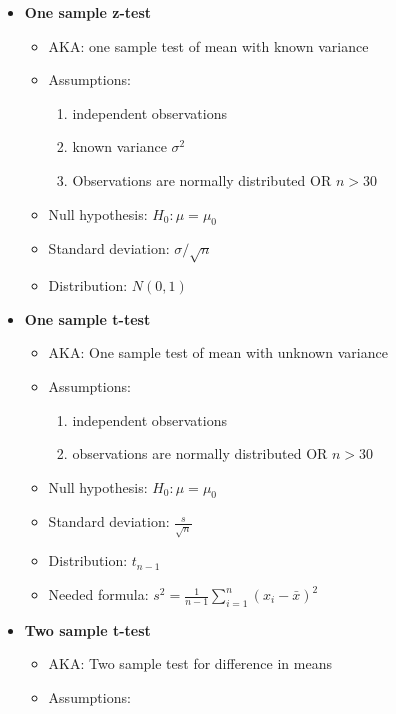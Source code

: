 \documentclass[]{book}
\providecommand{\tightlist}{%
  \setlength{\itemsep}{0pt}\setlength{\parskip}{0pt}}
\theoremstyle{definition}
\theoremstyle{definition}
\theoremstyle{definition}
\theoremstyle{remark}
\begin{document}
\begin{itemize}
\tightlist
\item
  \textbf{One sample z-test}

  \begin{itemize}
  \tightlist
  \item
    AKA: one sample test of mean with known variance
  \item
    Assumptions:

    \begin{enumerate}
    \def\labelenumi{\roman{enumi}.}
    \tightlist
    \item
      independent observations
    \item
      known variance \(\sigma^2\)
    \item
      Observations are normally distributed OR \(n > 30\)
    \end{enumerate}
  \item
    Null hypothesis: \(H_0: \mu = \mu_0\)
  \item
    Standard deviation: \(\sigma/\sqrt{n}\)
  \item
    Distribution: \(N(0,1)\)
  \end{itemize}
\item
  \textbf{One sample t-test}

  \begin{itemize}
  \tightlist
  \item
    AKA: One sample test of mean with unknown variance
  \item
    Assumptions:

    \begin{enumerate}
    \def\labelenumi{\roman{enumi}.}
    \tightlist
    \item
      independent observations
    \item
      observations are normally distributed OR \(n>30\)
    \end{enumerate}
  \item
    Null hypothesis: \(H_0: \mu = \mu_0\)
  \item
    Standard deviation: \(\frac{s}{\sqrt{n}}\)
  \item
    Distribution: \(t_{n-1}\)
  \item
    Needed formula: \(s^2 = \frac{1}{n-1} \sum_{i=1}^n (x_i - \bar{x})^2\)
  \end{itemize}
\item
  \textbf{Two sample t-test}

  \begin{itemize}
  \tightlist
  \item
    AKA: Two sample test for difference in means
  \item
    Assumptions:


\end{itemize}
\end{itemize}
\end{document}
